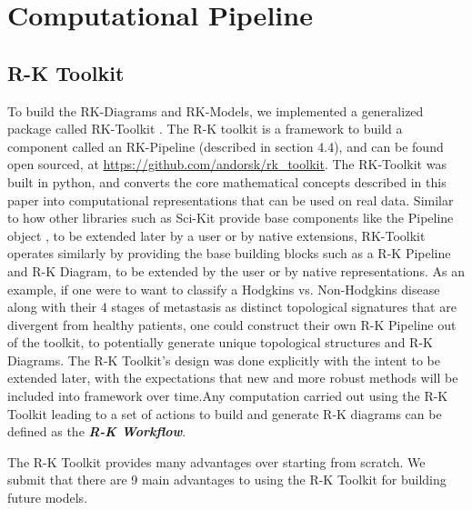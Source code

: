 \section{Computational Pipeline}

\subsection{R-K Toolkit}

 To build the RK-Diagrams and RK-Models, we implemented a generalized package called RK-Toolkit \cite{rktoolkit}. The R-K toolkit is a framework to build a component called an RK-Pipeline (described in section 4.4), and can be found open sourced, at \url{https://github.com/andorsk/rk_toolkit}. The RK-Toolkit was built in python, and converts the core mathematical concepts described in this paper into computational representations that can be used on real data. Similar to how other libraries such as Sci-Kit \cite{a2021_scikitlearn} provide base components like the Pipeline object \cite{a2021_61}, to be extended later by a user or by native extensions, RK-Toolkit operates similarly by providing the base building blocks such as a R-K Pipeline and R-K Diagram, to be extended by the user or by native representations. As an example, if one were to want to classify a Hodgkins vs. Non-Hodgkins disease along with their 4 stages of metastasis as distinct topological signatures that are divergent from healthy patients, one could construct their own R-K Pipeline out of the toolkit, to potentially generate unique topological structures and R-K Diagrams. The R-K Toolkit's design was done explicitly with the intent to be extended later, with the expectations that new and more robust methods will be included into framework over time.Any computation carried out using the R-K Toolkit leading to a set of actions to build and generate R-K diagrams can be defined as the \textbf{\textit{R-K Workflow}}.

The R-K Toolkit provides many advantages over starting from scratch. We submit that there are 9 main advantages to using the R-K Toolkit for building future models.

